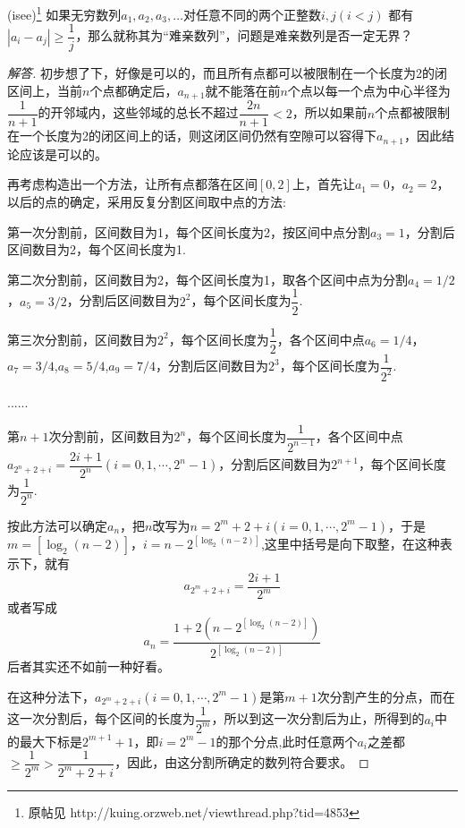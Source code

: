 \begin{exercise}
  (isee)\footnote{原帖见 http://kuing.orzweb.net/viewthread.php?tid=4853}
  如果无穷数列$a_1,a_2,a_3,\ldots $对任意不同的两个正整数$i,j(i<j)$ 都有$|a_i-a_j| \geqslant \dfrac{1}{j}$，那么就称其为“难亲数列”，问题是难亲数列是否一定无界？
\end{exercise}

\begin{proof}[解答]
  初步想了下，好像是可以的，而且所有点都可以被限制在一个长度为2的闭区间上，当前$n$个点都确定后，$a_{n+1}$就不能落在前$n$个点以每一个点为中心半径为$\dfrac{1}{n+1}$的开邻域内，这些邻域的总长不超过$\dfrac{2n}{n+1}<2$，所以如果前$n$个点都被限制在一个长度为2的闭区间上的话，则这闭区间仍然有空隙可以容得下$a_{n+1}$，因此结论应该是可以的。

  再考虑构造出一个方法，让所有点都落在区间$[0,2]$上，首先让$a_1=0$，$a_2=2$，以后的点的确定，采用反复分割区间取中点的方法:

第一次分割前，区间数目为1，每个区间长度为2，按区间中点分割$a_3=1$，分割后区间数目为2，每个区间长度为1.

第二次分割前，区间数目为2，每个区间长度为1，取各个区间中点为分割$a_4=1/2$，$a_5=3/2$，分割后区间数目为$2^2$，每个区间长度为$\dfrac{1}{2}$.

第三次分割前，区间数目为$2^2$，每个区间长度为$\dfrac{1}{2}$，各个区间中点$a_6=1/4$，$a_7=3/4$,$a_8=5/4$,$a_9=7/4$，分割后区间数目为$2^3$，每个区间长度为$\dfrac{1}{2^2}$.

......

第$n+1$次分割前，区间数目为$2^n$，每个区间长度为$\dfrac{1}{2^{n-1}}$，各个区间中点$a_{2^n+2+i}=\dfrac{2i+1}{2^n}(i=0,1,\cdots,2^n-1)$，分割后区间数目为$2^{n+1}$，每个区间长度为$\dfrac{1}{2^n}$.

按此方法可以确定$a_n$，把$n$改写为$n=2^m+2+i(i=0,1,\cdots,2^m-1)$，于是$m=[\log_2(n-2)]$，$i=n-2^{[\log_2(n-2)]}$,这里中括号是向下取整，在这种表示下，就有
\[ a_{2^m+2+i}=\frac{2i+1}{2^m} \]
或者写成
\[ a_n=\frac{1+2(n-2^{[\log_2(n-2)]})}{2^{[\log_2(n-2)]}} \]
后者其实还不如前一种好看。

在这种分法下，$a_{2^m+2+i}(i=0,1,\cdots,2^m-1)$是第$m+1$次分割产生的分点，而在这一次分割后，每个区间的长度为$\dfrac{1}{2^m}$，所以到这一次分割后为止，所得到的$a_i$中的最大下标是$2^{m+1}+1$，即$i=2^m-1$的那个分点,此时任意两个$a_i$之差都$\geqslant \dfrac{1}{2^m}>\dfrac{1}{2^m+2+i}$，因此，由这分割所确定的数列符合要求。
\end{proof}


